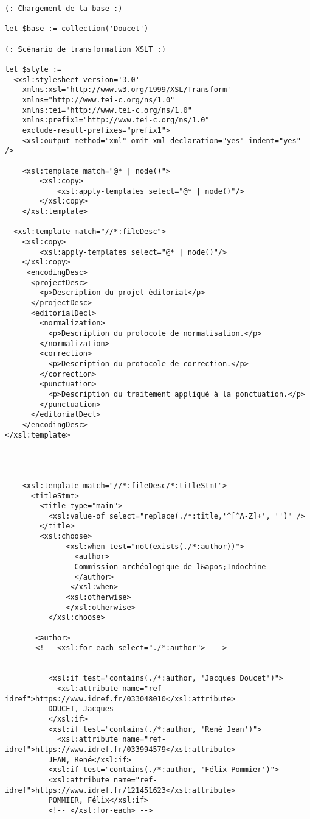 \begin{verbatim}
(: Chargement de la base :)

let $base := collection('Doucet')

(: Scénario de transformation XSLT :)

let $style :=
  <xsl:stylesheet version='3.0'
    xmlns:xsl='http://www.w3.org/1999/XSL/Transform'
    xmlns="http://www.tei-c.org/ns/1.0"
    xmlns:tei="http://www.tei-c.org/ns/1.0"
    xmlns:prefix1="http://www.tei-c.org/ns/1.0"
    exclude-result-prefixes="prefix1">       
    <xsl:output method="xml" omit-xml-declaration="yes" indent="yes" />
    
    <xsl:template match="@* | node()">
        <xsl:copy>
            <xsl:apply-templates select="@* | node()"/>                     
        </xsl:copy>          
    </xsl:template>
    
  <xsl:template match="//*:fileDesc">
    <xsl:copy>
        <xsl:apply-templates select="@* | node()"/>
    </xsl:copy>
     <encodingDesc>     
      <projectDesc>
        <p>Description du projet éditorial</p>
      </projectDesc>
      <editorialDecl>
        <normalization>
          <p>Description du protocole de normalisation.</p>
        </normalization>
        <correction>
          <p>Description du protocole de correction.</p>
        </correction>
        <punctuation>
          <p>Description du traitement appliqué à la ponctuation.</p>
        </punctuation>
      </editorialDecl>
    </encodingDesc>
</xsl:template>
    


    
    <xsl:template match="//*:fileDesc/*:titleStmt">
      <titleStmt>
        <title type="main">
          <xsl:value-of select="replace(./*:title,'^[^A-Z]+', '')" />
        </title>
        <xsl:choose>
              <xsl:when test="not(exists(./*:author))">
                <author>
                Commission archéologique de l&apos;Indochine
                </author>
               </xsl:when>  
              <xsl:otherwise>
              </xsl:otherwise>           
          </xsl:choose>
       
       <author>
       <!-- <xsl:for-each select="./*:author">  -->
  
   
          <xsl:if test="contains(./*:author, 'Jacques Doucet')">
            <xsl:attribute name="ref-idref">https://www.idref.fr/033048010</xsl:attribute>          
          DOUCET, Jacques
          </xsl:if>
          <xsl:if test="contains(./*:author, 'René Jean')">
            <xsl:attribute name="ref-idref">https://www.idref.fr/033994579</xsl:attribute>
          JEAN, René</xsl:if>
          <xsl:if test="contains(./*:author, 'Félix Pommier')">
          <xsl:attribute name="ref-idref">https://www.idref.fr/121451623</xsl:attribute>
          POMMIER, Félix</xsl:if>
          <!-- </xsl:for-each> -->



\end{verbatim}
